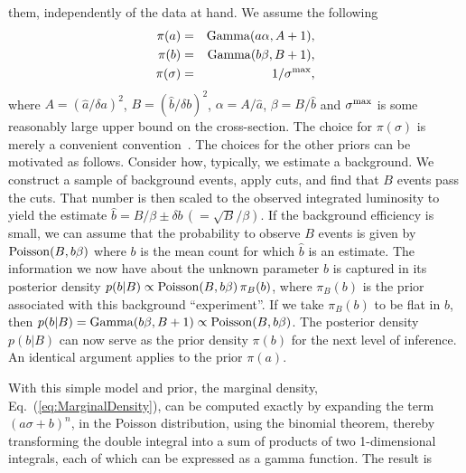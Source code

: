 \documentclass[preprint,eqsecnum,aps]{revtex4}
\newcommand{\poisson}[2]{{\rm Poisson}(#1, #2)}
\newcommand{\gam}[2]{{\rm Gamma}(#1, #2)}
\newcommand{\ha}{\hat{a}}
\newcommand{\hb}{\hat{b}}
\newcommand{\hA}{A}
\newcommand{\hB}{B}
\newcommand{\da}{\delta a}
\newcommand{\db}{\delta b}
\newcommand{\sigM}{\sigma^{\rm max}}
\newcommand{\prior}[1]{\pi(#1)}
\newcommand{\pdf}[2]{p(#1|#2)}
\newcommand{\Eq}[1]{Eq.\ (\ref{eq:#1})}
\begin{document}
them, independently of the data at hand. We assume the
following
\begin{eqnarray}
    \prior{a} 		& = & \gam{a \alpha}{\hA+1} , \\
    \prior{b} 		& = & \gam{b \beta}{\hB+1} , \\
    \prior{\sigma} 	& = & 1/\sigM,
\end{eqnarray}
where $\hA = (\ha / \da)^2$, $\hB = (\hb / \db)^2$, $\alpha = \hA / \ha$,
$\beta = \hB / \hb$ and $\sigM$ is some reasonably large upper
bound on the cross-section.
The choice for $\prior{\sigma}$ is merely a convenient 
convention~\cite{StatisticsWorkingGroup}. The choices for the other priors
can be motivated as follows. Consider how, typically, we estimate a 
background. We construct a sample of 
background events, apply cuts, and find that $B$ events pass the cuts. That
number is then scaled to the observed integrated luminosity 
to yield the estimate $\hb = B / \beta \pm \db \, (= \sqrt{B} / \beta)$. 
If the background efficiency is
small, we can assume that the probability to observe $B$ events is given
by $\poisson{B}{b \beta}$ where $b$ is the mean count for which $\hb$ is
an estimate.
The information we now have about the unknown
parameter $b$ is captured in
its posterior density 
$\pdf{b}{B} \propto \poisson{B}{b \beta} \, \pi_B(b)$,
where $\pi_B(b)$ is the prior associated with this background 
``experiment''. If we take $\pi_B(b)$ to be flat in $b$, then
$\pdf{b}{B} = \gam{b \beta}{B+1} \propto \poisson{B}{b \beta}$. The posterior
density $\pdf{b}{B}$ can now serve as the prior density $\prior{b}$ for the
next level of inference. An
identical argument applies to the prior $\prior{a}$.

With this simple model and prior, the marginal density, \Eq{MarginalDensity},
can be computed exactly by expanding the term $(a \sigma + b)^n$,
in the Poisson distribution, using
the binomial theorem, thereby transforming the double integral into a sum of 
products of two 1-dimensional integrals, each of which can be expressed as
a gamma function. The result is
\end{document}
